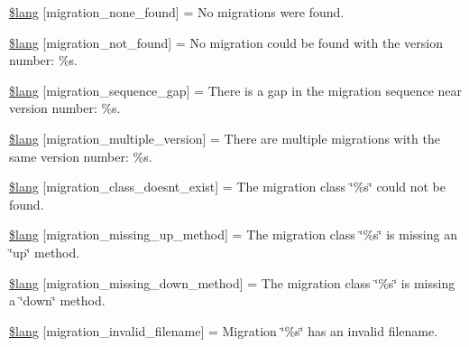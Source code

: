 \begin{DoxyCompactItemize}
\item 
\mbox{\hyperlink{migration__lang_8php_afe8d1d5a799cf952a04537e8b532c3d8}{\$lang}} \mbox{[}\textquotesingle{}migration\+\_\+none\+\_\+found\textquotesingle{}\mbox{]} = \textquotesingle{}No migrations were found.\textquotesingle{}
\item 
\mbox{\hyperlink{migration__lang_8php_ae6e7f5ef38bcbaf7b91c1324e463aa76}{\$lang}} \mbox{[}\textquotesingle{}migration\+\_\+not\+\_\+found\textquotesingle{}\mbox{]} = \textquotesingle{}No migration could be found with the version number\+: \%s.\textquotesingle{}
\item 
\mbox{\hyperlink{migration__lang_8php_a0ceeae7dff9f2e5ca94c1b2de395e49a}{\$lang}} \mbox{[}\textquotesingle{}migration\+\_\+sequence\+\_\+gap\textquotesingle{}\mbox{]} = \textquotesingle{}There is a gap in the migration sequence near version number\+: \%s.\textquotesingle{}
\item 
\mbox{\hyperlink{migration__lang_8php_ac377d2c284639a9d888aa911bd116a5e}{\$lang}} \mbox{[}\textquotesingle{}migration\+\_\+multiple\+\_\+version\textquotesingle{}\mbox{]} = \textquotesingle{}There are multiple migrations with the same version number\+: \%s.\textquotesingle{}
\item 
\mbox{\hyperlink{migration__lang_8php_a3bc11444283db3c991fe89233611ff71}{\$lang}} \mbox{[}\textquotesingle{}migration\+\_\+class\+\_\+doesnt\+\_\+exist\textquotesingle{}\mbox{]} = \textquotesingle{}The migration class \char`\"{}\%s\char`\"{} could not be found.\textquotesingle{}
\item 
\mbox{\hyperlink{migration__lang_8php_afc56383c5f93b9eb65f6249826d76f99}{\$lang}} \mbox{[}\textquotesingle{}migration\+\_\+missing\+\_\+up\+\_\+method\textquotesingle{}\mbox{]} = \textquotesingle{}The migration class \char`\"{}\%s\char`\"{} is missing an \char`\"{}up\char`\"{} method.\textquotesingle{}
\item 
\mbox{\hyperlink{migration__lang_8php_ab3b0b516243ce7ea4153798e808d0395}{\$lang}} \mbox{[}\textquotesingle{}migration\+\_\+missing\+\_\+down\+\_\+method\textquotesingle{}\mbox{]} = \textquotesingle{}The migration class \char`\"{}\%s\char`\"{} is missing a \char`\"{}down\char`\"{} method.\textquotesingle{}
\item 
\mbox{\hyperlink{migration__lang_8php_ac8e3b2b2f1cbd7c9863f108908efb424}{\$lang}} \mbox{[}\textquotesingle{}migration\+\_\+invalid\+\_\+filename\textquotesingle{}\mbox{]} = \textquotesingle{}Migration \char`\"{}\%s\char`\"{} has an invalid filename.\textquotesingle{}
\end{DoxyCompactItemize}


